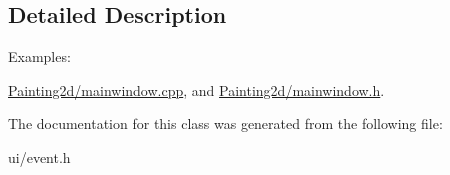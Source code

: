 \subsection{Detailed Description}
\begin{Desc}
\item[Examples\+: ]\par
\hyperlink{_painting2d_2mainwindow_8cpp-example}{Painting2d/mainwindow.\+cpp}, and \hyperlink{_painting2d_2mainwindow_8h-example}{Painting2d/mainwindow.\+h}.\end{Desc}


The documentation for this class was generated from the following file\+:\begin{DoxyCompactItemize}
\item 
ui/event.\+h\end{DoxyCompactItemize}
